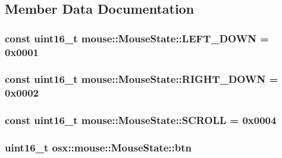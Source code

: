 \subsection{Member Data Documentation}
\hypertarget{structosx_1_1mouse_1_1_mouse_state_a9490a7acba9726f815fa3246985da50b}{
\subsubsection[{L\-E\-F\-T\-\_\-\-D\-O\-W\-N}]{\setlength{\rightskip}{0pt plus 5cm}const uint16\-\_\-t {\bf mouse\-::\-Mouse\-State\-::\-L\-E\-F\-T\-\_\-\-D\-O\-W\-N} = 0x0001}}\label{structosx_1_1mouse_1_1_mouse_state_a9490a7acba9726f815fa3246985da50b}
\hypertarget{structosx_1_1mouse_1_1_mouse_state_a23bf52536a66f3ca8f3d1cebb0f401ee}{
\subsubsection[{R\-I\-G\-H\-T\-\_\-\-D\-O\-W\-N}]{\setlength{\rightskip}{0pt plus 5cm}const uint16\-\_\-t {\bf mouse\-::\-Mouse\-State\-::\-R\-I\-G\-H\-T\-\_\-\-D\-O\-W\-N} = 0x0002}}\label{structosx_1_1mouse_1_1_mouse_state_a23bf52536a66f3ca8f3d1cebb0f401ee}
\hypertarget{structosx_1_1mouse_1_1_mouse_state_a09e8666395882198d1bca0a745f216df}{
\subsubsection[{S\-C\-R\-O\-L\-L}]{\setlength{\rightskip}{0pt plus 5cm}const uint16\-\_\-t {\bf mouse\-::\-Mouse\-State\-::\-S\-C\-R\-O\-L\-L} = 0x0004}}\label{structosx_1_1mouse_1_1_mouse_state_a09e8666395882198d1bca0a745f216df}
\hypertarget{structosx_1_1mouse_1_1_mouse_state_a2463a45ed53f3952c6d9a544a5dd680b}{
\subsubsection[{btn}]{\setlength{\rightskip}{0pt plus 5cm}uint16\-\_\-t {\bf osx\-::mouse\-::\-Mouse\-State\-::btn}}}\label{structosx_1_1mouse_1_1_mouse_state_a2463a45ed53f3952c6d9a544a5dd680b}


